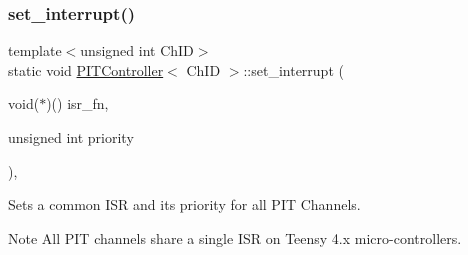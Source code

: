 \subsubsection{\texorpdfstring{set\+\_\+interrupt()}{set\_interrupt()}}
{\footnotesize\ttfamily template$<$unsigned int Ch\+ID$>$ \\
static void \hyperlink{classPITController}{P\+I\+T\+Controller}$<$ Ch\+ID $>$\+::set\+\_\+interrupt (\begin{DoxyParamCaption}\item[{void($\ast$)()}]{isr\+\_\+fn,  }\item[{unsigned int}]{priority }\end{DoxyParamCaption})\hspace{0.3cm}{\ttfamily [inline]}, {\ttfamily [static]}}



Sets a common I\+SR and its priority for all P\+IT Channels. 

\begin{DoxyNote}{Note}
All P\+IT channels share a single I\+SR on Teensy 4.\+x micro-\/controllers. 
\end{DoxyNote}
